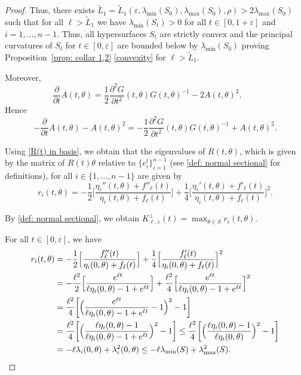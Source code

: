 \documentclass[JEP,XML,SOM,Unicode,NoFloatCountersInSection]{cedram}
\theoremstyle{definition}
\let\eps\varepsilon
\renewcommand{\>}{{\rangle}}
\newcommand{\<}{{\langle}}
\begin{document}
\begin{proof}
Thus, there exists $\tilde L_1=\tilde L_1(\eps, \lambda_{\min}(S_0), \lambda_{\max}(S_0), \rho)>2\lambda_{\max}(S_0)$ such that for all $\ell>\tilde L_1$ we have $\lambda_{\min}(S_t)>0$ for all $t\in[0,1+\eps]$ and $i=1,\ldots, n-1$. Thus, all hypersurfaces $S_t$ are strictly convex and the principal curvatures of $S_t$ for $t\in[0,\eps]$ are bounded below by $\lambda_{\min}(S_0)$ proving Proposition~\ref{prop: collar 1,2} \eqref{convexity} for $\ell> \tilde L_1$.

Moreover,
\[
\frac{\partial}{\partial t}A(t,\theta) = \frac{1}{2}\frac{\partial^2 G}{\partial t^2}(t,\theta)G(t,\theta)^{-1}-2A(t,\theta)^2. \qquad \text{}\nonumber
\]
Hence
\begin{equation}
-\frac{\partial}{\partial t}A(t,\theta)-A(t,\theta)^2 = -\frac{1}{2}\frac{\partial^2 G}{\partial t^2}(t,\theta)G(t,\theta)^{-1}+A(t,\theta)^2.\label{R(t) in basis}
\end{equation}

Using \eqref{R(t) in basis}, we obtain that the eigenvalues of $R(t,\theta)$, which is given by the matrix of $R(t)\theta$ relative to $\{e_i^t\}_{i=1}^{n-1}$ (see \eqref{def: normal sectional} for definitions), for all $i\in\{1,\ldots, n-1\}$ are given by
\begin{equation}\label{eigenvalues of R(t)}
r_i(t,\theta)=-\frac{1}{2}\biggl[\frac{\eta_i''(t,\theta)+f''_\ell(t)}{\eta_i(t,\theta)+f_\ell(t)}\biggr]+\frac{1}{4}\biggl[\frac{\eta_i'(t,\theta)+f'_\ell(t)}{\eta_i(t,\theta)+f_\ell(t)}\biggr]^2.
\end{equation}

By \eqref{def: normal sectional}, we obtain $K^\perp_{\ell,\eps}(t)=\max_{\theta\in S} r_i(t,\theta)$.

For all $t\in[0,\eps]$, we have
\begin{align*}
r_i(t,\theta) &= -\frac{1}{2}\Bigl[\frac{f''_\ell(t)}{\eta_i(0,\theta)+f_\ell(t)}\Bigr]+\frac{1}{4}\Bigl[\frac{f'_\ell(t)}{\eta_i(0,\theta)+f_\ell(t)}\Bigr]^2\\
&=-\frac{\ell^2}{2}\Bigl[\frac{e^{\ell t}}{\ell\eta_i(0,\theta)-1+e^{\ell t}}\Bigr]+\frac{\ell^2}{4}\Bigl[\frac{e^{\ell t}}{\ell\eta_i(0,\theta)-1+e^{\ell t}}\Bigr]^2\\
&=\frac{\ell^2}{4}\biggl[\Bigl(\frac{e^{\ell t}}{\ell\eta_i(0,\theta)-1+e^{\ell t}}-1\Bigr)^2-1\biggr]\\
&=\frac{\ell^2}{4}\biggl[\Bigl(\frac{\ell\eta_i(0,\theta)-1}{\ell\eta_i(0,\theta)-1+e^{\ell t}}\Bigr)^2-1\biggr]\leq \frac{\ell^2}{4}\biggl[\Bigl(\frac{\ell\eta_i(0,\theta)-1}{\ell\eta_i(0,\theta)}\Bigr)^2-1\biggr]\\
&= -\ell\lambda_i(0,\theta)+\lambda^2_i(0,\theta)\leq -\ell\lambda_{\min}(S)+\lambda^2_{\max}(S).
\end{align*}


\end{proof}
\end{document}
